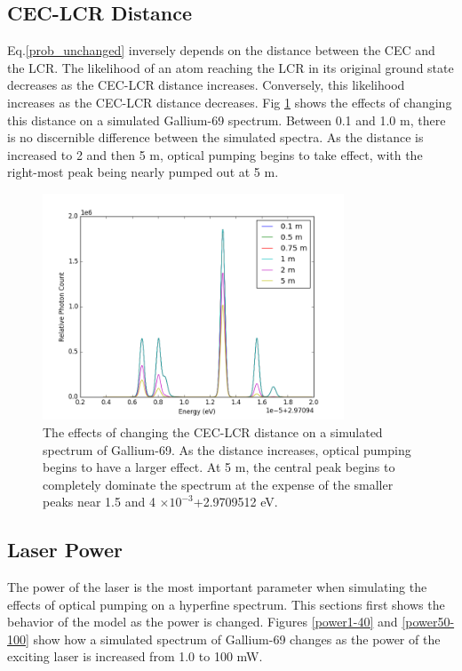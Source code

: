 \subsection{CEC-LCR Distance}
Eq.\ref{prob_unchanged} inversely depends on the distance between the CEC and the LCR. The likelihood of an atom reaching the LCR in its original ground state decreases as the CEC-LCR distance increases. Conversely, this likelihood increases as the CEC-LCR distance decreases. Fig \ref{CEC-LCR} shows the effects of changing this distance on a simulated Gallium-69 spectrum. Between 0.1 and 1.0 m, there is no discernible difference between the simulated spectra. As the distance is increased to 2 and then 5 m, optical pumping begins to take effect, with the right-most peak being nearly pumped out at 5 m. 
\begin{figure}[h!]
\begin{center}
\includegraphics[width=0.8\textwidth]{Graphics/dist_comparison.png}
\end{center}
\caption[The effects of changing the CEC-LCR distance on a simulated spectrum of Gallium-69.]{\small The effects of changing the CEC-LCR distance on a simulated spectrum of Gallium-69. As the distance increases, optical pumping begins to have a larger effect. At 5 m, the central peak begins to completely dominate the spectrum at the expense of the smaller peaks near 1.5 and 4 $\times 10^{-3}$+2.9709512 eV.}
\label{CEC-LCR}
\end{figure}

\subsection{Laser Power}
The power of the laser is the most important parameter when simulating the effects of optical pumping on a hyperfine spectrum. This sections first shows the behavior of the model as the power is changed. Figures \ref{power1-40} and \ref{power50-100} show how a simulated spectrum of Gallium-69 changes as the power of the exciting laser is increased from 1.0 to 100 mW. 

